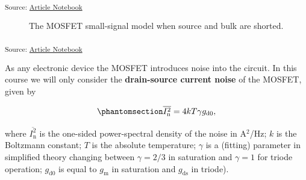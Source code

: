 \documentclass[
  a4paper,
  DIV=11,
  numbers=noendperiod]{scrartcl}
\begin{document}
\textsubscript{Source:
\href{https://iic-jku.github.io/analog-circuit-design/index.qmd.html}{Article
Notebook}}

\begin{figure}[H]


\caption{\label{fig-mosfet-small-signal-model-simplified}The MOSFET
small-signal model when source and bulk are shorted.}

\end{figure}%

\textsubscript{Source:
\href{https://iic-jku.github.io/analog-circuit-design/index.qmd.html}{Article
Notebook}}

As any electronic device the MOSFET introduces noise into the circuit.
In this course we will only consider the \textbf{drain-source current
noise} of the MOSFET, given by

\begin{equation}\phantomsection\label{eq-mosfet-noise}{
\overline{I_\mathrm{n}^2} = 4 k T \gamma g_\mathrm{d0},
}\end{equation}

where \(\overline{I_\mathrm{n}^2}\) is the one-sided power-spectral
density of the noise in A\(^2\)/Hz; \(k\) is the Boltzmann constant;
\(T\) is the absolute temperature; \(\gamma\) is a (fitting) parameter
in simplified theory changing between \(\gamma = 2/3\) in saturation and
\(\gamma =1\) for triode operation; \(g_\mathrm{d0}\) is equal to
\(g_\mathrm{m}\) in saturation and \(g_\mathrm{ds}\) in triode).
\end{document}
